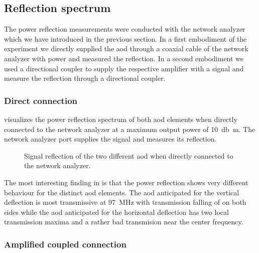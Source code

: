 \subsection{Reflection spectrum}

The power reflection measurements were conducted with the network analyzer
which we have introduced in the previous section. In a first embodiment of the
experiment we directly supplied the \gls{aod} through a coaxial cable of the
network analyzer with power and measured the reflection. In a second
embodiment we used a directional coupler to supply the respective amplifier
with a signal and measure the reflection through a directional coupler.

\subsubsection{Direct connection}

 visualizes the power reflection spectrum
of both \gls{aod} elements when directly connected to the network analyzer at
a maximum output power of \SI{10}{\decibel\meter}. The network analyzer port
supplies the signal and measures its reflection.
\begin{figure}[htb]
  \centering
  \begin{adjustbox}{width=\textwidth}
    
  \end{adjustbox}
  \caption{Signal reflection of the two different \gls{aod} when directly
    connected to the network analyzer.
  }\label{fig:signal_reflection_direct}
\end{figure}
The most interesting finding in  is that
the power reflection shows very different behaviour for the distinct \gls{aod}
elements. The \gls{aod} anticipated for the vertical deflection is most
transmissive at \SI{97}{\mega\hertz} with transmission falling of on both
sides while the \gls{aod} anticipated for the horizontal deflection has two
local transmission maxima and a rather bad transmision near the center
frequency.

\subsubsection{Amplified coupled connection}

